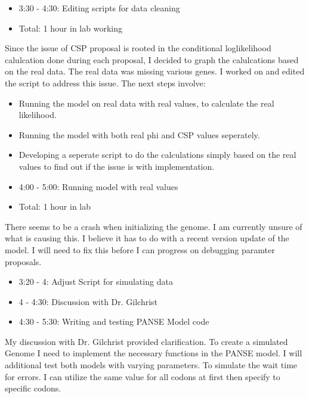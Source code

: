 \documentclass[12pt,hyperref]{labbook}
\begin{document}
\begin{itemize}
    \item 3:30 - 4:30: Editing scripts for data cleaning
    \item Total: 1 hour in lab working
\end{itemize}
    Since the issue of CSP proposal is rooted in the conditional loglikelihood calulcation done during each proposal, I decided to graph 
    the calulcations based on the real data. The real data was missing various genes. I worked on and edited the script to address this 
    issue. The next steps involve:
\begin{itemize}
    \item Running the model on real data with real values, to calculate the real likelihood.
    \item Running the model with both real phi and CSP values seperately.
    \item Developing a seperate script to do the calculations simply based on the real values to find out if the issue is with 
        implementation.
\end{itemize}
\begin{itemize}
    \item 4:00 - 5:00: Running model with real values
    \item Total: 1 hour in lab
\end{itemize}
There seems to be a crash when initializing the genome. I am currently unsure of what is causing this. I believe it has to do with a recent 
version update of the model. I will need to fix this before I can progress on debugging paramter proposals.
\begin{itemize}
    \item 3:20 - 4: Adjust Script for simulating data
    \item 4 - 4:30: Discussion with Dr. Gilchrist
    \item 4:30 - 5:30: Writing and testing PANSE Model code
\end{itemize}
My discussion with Dr. Gilchrist provided clarification. To create a simulated Genome I need to implement the
necessary functions in the PANSE model. I will additional test both models with varying parameters. To simulate the wait
time for errors. I can utilize the same value for all codons at first then specify to specific codons.
\end{document}
